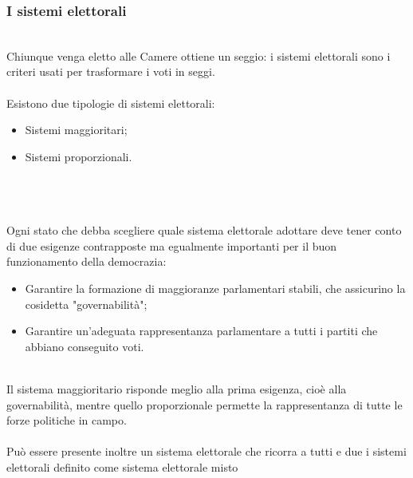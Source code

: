 \documentclass{report}
\begin{document}
\subsubsection{I sistemi elettorali}
\\
Chiunque venga eletto alle Camere ottiene un seggio: i sistemi elettorali sono i criteri usati per trasformare i voti in seggi.
\\
\\
Esistono due tipologie di sistemi elettorali:
\\
\begin{itemize}
  \item Sistemi maggioritari;
  \item Sistemi proporzionali.
\end{itemize}
\\
\\
\\
Ogni stato che debba scegliere quale sistema elettorale adottare deve tener conto di due esigenze contrapposte ma egualmente importanti per il buon funzionamento della democrazia:
\\
\begin{itemize}
  \item Garantire la formazione di maggioranze parlamentari stabili, che assicurino la cosidetta "governabilità";
  \item Garantire un'adeguata rappresentanza parlamentare a tutti i partiti che abbiano conseguito voti.
\end{itemize}
\\
Il sistema maggioritario risponde meglio alla prima esigenza, cioè alla governabilità, mentre quello proporzionale permette la rappresentanza di tutte le forze politiche in campo.
\\
\\
Può essere presente inoltre un sistema elettorale che ricorra a tutti e due i sistemi elettorali definito come sistema elettorale misto
\\
\end{document}
